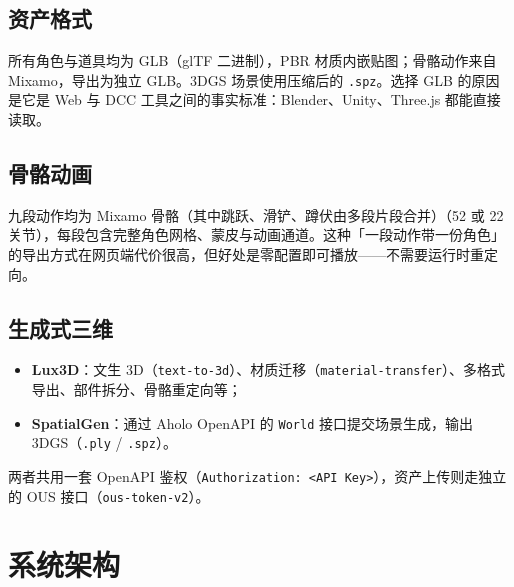 \documentclass[UTF8,a4paper,11pt]{ctexart}
\begin{document}
\subsection{资产格式}
所有角色与道具均为 GLB（glTF 二进制），PBR 材质内嵌贴图；骨骼动作来自 Mixamo，导出为独立 GLB。3DGS 场景使用压缩后的 \texttt{.spz}。选择 GLB 的原因是它是 Web 与 DCC 工具之间的事实标准：Blender、Unity、Three.js 都能直接读取。

\subsection{骨骼动画}
九段动作均为 Mixamo 骨骼（其中跳跃、滑铲、蹲伏由多段片段合并）（52 或 22 关节），每段包含完整角色网格、蒙皮与动画通道。这种「一段动作带一份角色」的导出方式在网页端代价很高，但好处是零配置即可播放——不需要运行时重定向。

\subsection{生成式三维}
\begin{itemize}[itemsep=2pt]
  \item \textbf{Lux3D}：文生 3D（\texttt{text-to-3d}）、材质迁移（\texttt{material-transfer}）、多格式导出、部件拆分、骨骼重定向等；
  \item \textbf{SpatialGen}：通过 Aholo OpenAPI 的 \texttt{World} 接口提交场景生成，输出 3DGS（\texttt{.ply} / \texttt{.spz}）。
\end{itemize}
两者共用一套 OpenAPI 鉴权（\texttt{Authorization: <API Key>}），资产上传则走独立的 OUS 接口（\texttt{ous-token-v2}）。

\section{系统架构}
\end{document}
